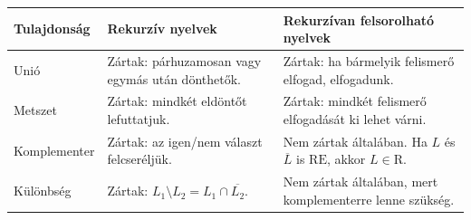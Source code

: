 \begin{tabularx}{\textwidth}{L{34mm}L{37mm}X}
\toprule
\textbf{Tulajdonság} & \textbf{Rekurzív nyelvek} & \textbf{Rekurzívan felsorolható nyelvek} \\
\midrule
Unió & Zártak: párhuzamosan vagy egymás után dönthetők. & Zártak: ha bármelyik felismerő elfogad, elfogadunk. \\
Metszet & Zártak: mindkét eldöntőt lefuttatjuk. & Zártak: mindkét felismerő elfogadását ki lehet várni. \\
Komplementer & Zártak: az igen/nem választ felcseréljük. & Nem zártak általában. Ha $L$ és $\overline L$ is $\mathrm{RE}$, akkor $L\in\mathrm{R}$. \\
Különbség & Zártak: $L_1\setminus L_2=L_1\cap\overline{L_2}$. & Nem zártak általában, mert komplementerre lenne szükség. \\
\bottomrule
\end{tabularx}
